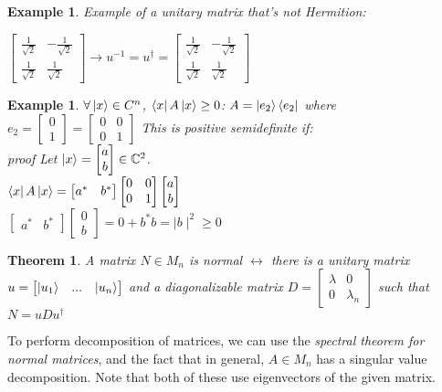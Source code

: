 \documentclass[12pt]{article}
\theoremstyle{plain}
\newtheorem{theorem}[lemma]{Theorem}
\theoremstyle{nonumberplain}
\theoremstyle{plain}
\newtheorem{example}[lemma]{Example}
\theoremstyle{nonumberplain}
\newcommand\1{{\bf 1}}
\newcommand{\bmat}[1]{\begin{bmatrix*} #1 \end{bmatrix*}} %
\newcommand{\C}{\mathbb{C}} %
\newcommand{\<}{\left\langle}
\renewcommand{\>}{\right\rangle}
\begin{document}
\begin{example}
Example of a unitary matrix that's not Hermition: 
\begin{center}
$\bmat{\frac{1}{\sqrt{2}} & -\frac{1}{\sqrt{2}} \\ \frac{1}{\sqrt{2}} & \frac{1}{\sqrt{2}}}\longrightarrow u^{-1}=u^\dagger=\bmat{\frac{1}{\sqrt{2}} & -\frac{1}{\sqrt{2}} \\ \frac{1}{\sqrt{2}} & \frac{1}{\sqrt{2}}}$
\end{center}
\end{example}
\begin{example}
$\forall\ket{x}\in{C^n}$, $\bra{x}A\ket{x}\geq 0$: $A=\ket{e_2}\bra{e_2}$ where $e_2=\bmat{0 \\ 1}=\bmat{0 & 0 \\ 0 & 1}$ This is positive semidefinite if: \\
\textit{proof} Let $\ket{x}=\bmat{a \\ b}\in\C^2$. \\
$\bra{x}A\ket{x}=\bmat{a^* & b^*}\bmat{0 & 0 \\ 0 & 1}\bmat{a \\ b}$ \\
$\bmat{a^* & b^*}\bmat{0 \\ b}=0+b^*b=\mid b\mid^2\geq0$
\end{example}
\begin{theorem}
A matrix $N\in M_n$ is normal $\longleftrightarrow$ there is a unitary matrix $u=\bmat{\ket{u_1} & ... & \ket{u_n}}$ and a diagonalizable matrix $D=\bmat{\lambda & 0 \\ 0 & \lambda_n}$ such that $N=uDu^\dagger$
\end{theorem}
To perform decomposition of matrices, we can use the \textit{spectral theorem for normal matrices}, and the fact that in general, $A\in M_n$ has a singular value decomposition. Note that both of these use eigenvectors of the given matrix.

\end{document}
